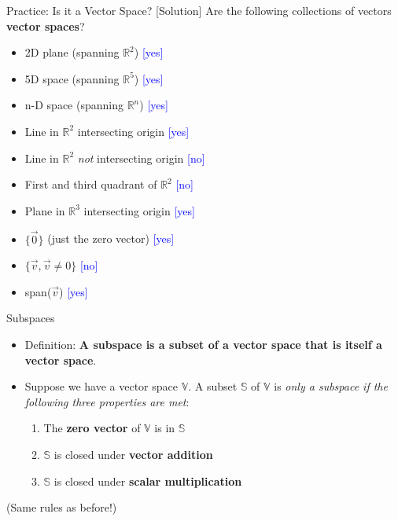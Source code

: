 \begin{frame}{Practice: Is it a Vector Space? [Solution]}
    Are the following collections of vectors \textbf{vector spaces}?
    \begin{itemize}
        \item 2D plane (spanning $\mathbb{R}^2$) \textcolor{blue}{[yes]}
        \item 5D space (spanning $\mathbb{R}^5$) \textcolor{blue}{[yes]}
        \item n-D space (spanning $\mathbb{R}^n$) \textcolor{blue}{[yes]}
        \item Line in $\mathbb{R}^2$ intersecting origin \textcolor{blue}{[yes]}
        \item Line in $\mathbb{R}^2$ \textit{not} intersecting origin \textcolor{blue}{[no]}
        \item First and third quadrant of $\mathbb{R}^2$ \textcolor{blue}{[no]}
        \item Plane in $\mathbb{R}^3$ intersecting origin \textcolor{blue}{[yes]}
        \item $\{\vec{0}\}$ (just the zero vector) \textcolor{blue}{[yes]}
        \item $\{\vec{v}, \vec{v} \neq 0\}$ \textcolor{blue}{[no]}
        \item span($\vec{v}$) \textcolor{blue}{[yes]}
    \end{itemize}
\end{frame}

\begin{frame}{Subspaces}
    \begin{itemize}
        \item Definition: \textbf{A subspace is a subset of a vector space that is itself a vector space}. \\[1.5ex]
        \item Suppose we have a vector space $\mathbb{V}$. A subset $\mathbb{S}$ of $\mathbb{V}$ is \textit{only a subspace if the following three properties are met}: \\[1.5ex]
        \begin{enumerate}
            \item The \textbf{zero vector} of $\mathbb{V}$ is in $\mathbb{S}$
            \item $\mathbb{S}$ is closed under \textbf{vector addition}
            \item $\mathbb{S}$ is closed under \textbf{scalar multiplication}
        \end{enumerate}
    \end{itemize}
    (Same rules as before!)
\end{frame}

